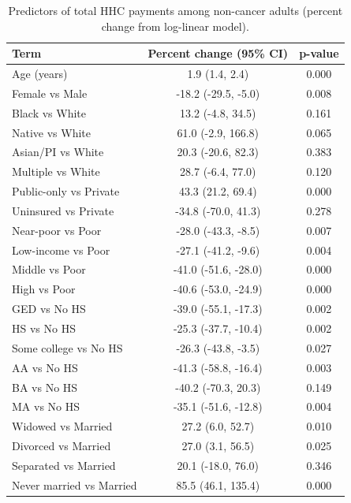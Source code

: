 
\begin{longtable}[t]{lcc}
\caption{\label{tab:tab:costs-noncancer}Predictors of total HHC payments among non-cancer adults (percent change from log-linear model).}\\
\toprule
Term & Percent change (95\% CI) & p-value\\
\midrule
Age (years) & 1.9 (1.4, 2.4) & 0.000\\
Female vs Male & -18.2 (-29.5, -5.0) & 0.008\\
Black vs White & 13.2 (-4.8, 34.5) & 0.161\\
Native vs White & 61.0 (-2.9, 166.8) & 0.065\\
Asian/PI vs White & 20.3 (-20.6, 82.3) & 0.383\\
\addlinespace
Multiple vs White & 28.7 (-6.4, 77.0) & 0.120\\
Public-only vs Private & 43.3 (21.2, 69.4) & 0.000\\
Uninsured vs Private & -34.8 (-70.0, 41.3) & 0.278\\
Near-poor vs Poor & -28.0 (-43.3, -8.5) & 0.007\\
Low-income vs Poor & -27.1 (-41.2, -9.6) & 0.004\\
\addlinespace
Middle vs Poor & -41.0 (-51.6, -28.0) & 0.000\\
High vs Poor & -40.6 (-53.0, -24.9) & 0.000\\
GED vs No HS & -39.0 (-55.1, -17.3) & 0.002\\
HS vs No HS & -25.3 (-37.7, -10.4) & 0.002\\
Some college vs No HS & -26.3 (-43.8, -3.5) & 0.027\\
\addlinespace
AA vs No HS & -41.3 (-58.8, -16.4) & 0.003\\
BA vs No HS & -40.2 (-70.3, 20.3) & 0.149\\
MA vs No HS & -35.1 (-51.6, -12.8) & 0.004\\
Widowed vs Married & 27.2 (6.0, 52.7) & 0.010\\
Divorced vs Married & 27.0 (3.1, 56.5) & 0.025\\
\addlinespace
Separated vs Married & 20.1 (-18.0, 76.0) & 0.346\\
Never married vs Married & 85.5 (46.1, 135.4) & 0.000\\
\bottomrule
\end{longtable}
